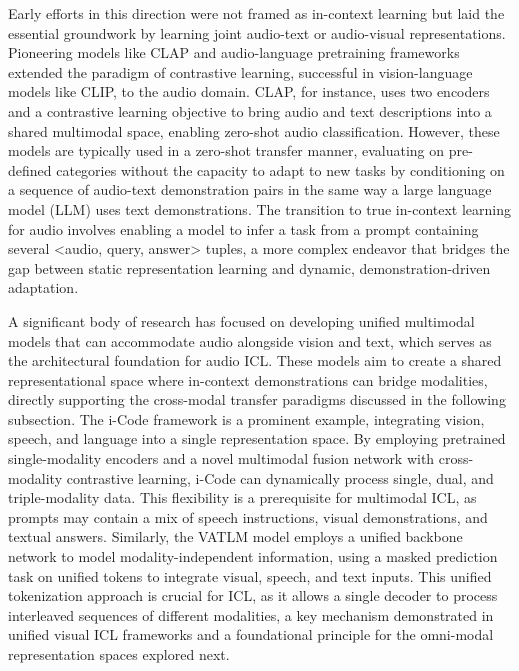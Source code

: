 \documentclass[11pt]{article}
\begin{document}
Early efforts in this direction were not framed as in-context learning but laid the essential groundwork by learning joint audio-text or audio-visual representations. Pioneering models like CLAP \cite{ref281} and audio-language pretraining frameworks \cite{ref282} extended the paradigm of contrastive learning, successful in vision-language models like CLIP, to the audio domain. CLAP, for instance, uses two encoders and a contrastive learning objective to bring audio and text descriptions into a shared multimodal space, enabling zero-shot audio classification. However, these models are typically used in a zero-shot transfer manner, evaluating on pre-defined categories without the capacity to adapt to new tasks by conditioning on a sequence of audio-text demonstration pairs in the same way a large language model (LLM) uses text demonstrations. The transition to true in-context learning for audio involves enabling a model to infer a task from a prompt containing several \textless audio, query, answer\textgreater{} tuples, a more complex endeavor that bridges the gap between static representation learning and dynamic, demonstration-driven adaptation.

A significant body of research has focused on developing unified multimodal models that can accommodate audio alongside vision and text, which serves as the architectural foundation for audio ICL. These models aim to create a shared representational space where in-context demonstrations can bridge modalities, directly supporting the cross-modal transfer paradigms discussed in the following subsection. The i-Code framework \cite{ref283} is a prominent example, integrating vision, speech, and language into a single representation space. By employing pretrained single-modality encoders and a novel multimodal fusion network with cross-modality contrastive learning, i-Code can dynamically process single, dual, and triple-modality data. This flexibility is a prerequisite for multimodal ICL, as prompts may contain a mix of speech instructions, visual demonstrations, and textual answers. Similarly, the VATLM model \cite{ref284} employs a unified backbone network to model modality-independent information, using a masked prediction task on unified tokens to integrate visual, speech, and text inputs. This unified tokenization approach is crucial for ICL, as it allows a single decoder to process interleaved sequences of different modalities, a key mechanism demonstrated in unified visual ICL frameworks \cite{ref285} and a foundational principle for the omni-modal representation spaces explored next.
\end{document}
